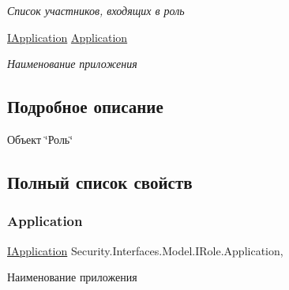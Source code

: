 \begin{DoxyCompactItemize}
\begin{DoxyCompactList}\small\item\em Список участников, входящих в роль \end{DoxyCompactList}\item 
\hyperlink{interface_security_1_1_interfaces_1_1_model_1_1_i_application}{I\+Application} \hyperlink{interface_security_1_1_interfaces_1_1_model_1_1_i_role_adcdcf154adcf01c16074c38a150aca7b}{Application}
\begin{DoxyCompactList}\small\item\em Наименование приложения \end{DoxyCompactList}\end{DoxyCompactItemize}


\subsection{Подробное описание}
Объект \char`\"{}Роль\char`\"{} 



\subsection{Полный список свойств}
\mbox{\label{interface_security_1_1_interfaces_1_1_model_1_1_i_role_adcdcf154adcf01c16074c38a150aca7b}} 
\subsubsection{\texorpdfstring{Application}{Application}}
{\footnotesize\ttfamily \hyperlink{interface_security_1_1_interfaces_1_1_model_1_1_i_application}{I\+Application} Security.\+Interfaces.\+Model.\+I\+Role.\+Application\hspace{0.3cm}{\ttfamily [get]}, {\ttfamily [set]}}



Наименование приложения 

\mbox{\label{interface_security_1_1_interfaces_1_1_model_1_1_i_role_af765b879a0d7378e8737d4e262c8c6cd}} 
